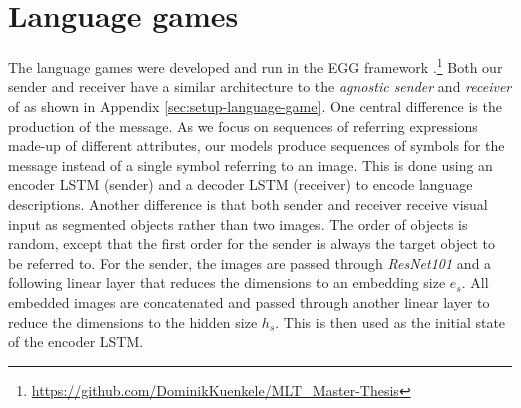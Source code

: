 \documentclass[11pt]{article}
\begin{document}
\section{Language games}
The language games were developed and run in the EGG framework \citep{Kharitonov2019}.\footnote{\href{https://github.com/DominikKuenkele/MLT\_Master-Thesis}{https://github.com/DominikKuenkele/MLT\_Master-Thesis}}
Both our sender and receiver have a similar architecture to the \emph{agnostic sender} and \emph{receiver} of \citep{Lazaridou2016} as shown in Appendix \ref*{sec:setup-language-game}.
One central difference is the production of the message.
As we focus on sequences of referring expressions made-up of different attributes, our models produce sequences of symbols for the message %
instead of a single symbol referring to an image. %
This is done using an encoder LSTM (sender) and a decoder LSTM (receiver) to encode language descriptions. 
%
%
%
Another difference is that both sender and receiver receive visual input as segmented objects rather than two images.
The order of objects is random, except that the first order for the sender is always the target object to be referred to.
For the sender, the images are passed through \emph{ResNet101} \citep{He2016} and a following linear layer that reduces the dimensions to an embedding size $e_s$.
All embedded images are concatenated and passed through another linear layer to reduce the dimensions to the hidden size $h_s$.
This is then used as the initial state of the encoder LSTM.
\end{document}
